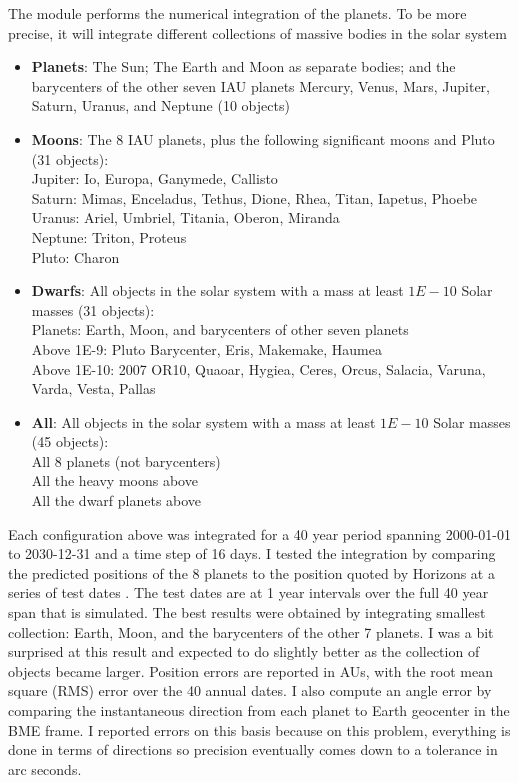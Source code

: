 The module  performs the numerical integration of the planets.
To be more precise, it will integrate different collections of massive bodies in the solar system
\begin{itemize}
\item \textbf{Planets}: The Sun; The Earth and Moon as separate bodies; and the barycenters of the other seven IAU planets 
Mercury, Venus, Mars, Jupiter, Saturn, Uranus, and Neptune (10 objects)
\item \textbf{Moons}: The 8 IAU planets, plus the following significant moons and Pluto (31 objects): \\
Jupiter: Io, Europa, Ganymede, Callisto \\
Saturn: Mimas, Enceladus, Tethus, Dione, Rhea, Titan, Iapetus, Phoebe \\
Uranus: Ariel, Umbriel, Titania, Oberon, Miranda \\
Neptune: Triton, Proteus \\
Pluto: Charon 
\item \textbf{Dwarfs}: All objects in the solar system with a mass at least $1E-10$ Solar masses (31 objects): \\
Planets: Earth, Moon, and barycenters of other seven planets \\
Above 1E-9: Pluto Barycenter, Eris, Makemake, Haumea \\
Above 1E-10: 2007 OR10, Quaoar, Hygiea, Ceres, Orcus, Salacia, Varuna, Varda, Vesta, Pallas
\item \textbf{All}: All objects in the solar system with a mass at least $1E-10$ Solar masses (45 objects): \\
All 8 planets (not barycenters) \\
All the heavy moons above \\
All the dwarf planets above
\end{itemize}

Each configuration above was integrated for a 40 year period spanning 2000-01-01 to 2030-12-31 and a time step of 16 days.
I tested the integration by comparing the predicted positions of the 8 planets to the position quoted by Horizons at a series of test dates .
The test dates are at 1 year intervals over the full 40 year span that is simulated.
The best results were obtained by integrating smallest collection: Earth, Moon, and the barycenters of the other 7 planets.
I was a bit surprised at this result and expected to do slightly better as the collection of objects became larger.
Position errors are reported in AUs, with the root mean square (RMS) error over the 40 annual dates.
I also compute an angle error by comparing the instantaneous direction from each planet to Earth geocenter in the BME frame.
I reported errors on this basis because on this problem, everything is done in terms of directions so precision eventually
comes down to a tolerance in arc seconds.

